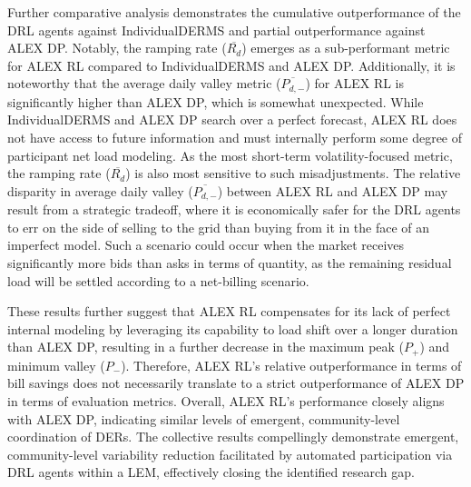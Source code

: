 \documentclass[preprint, 12pt]{elsarticle}
\begin{document}
Further comparative analysis demonstrates the cumulative outperformance of the DRL agents against IndividualDERMS and partial outperformance against ALEX DP. Notably, the ramping rate ($\overline{R_{d}}$) emerges as a sub-performant metric for ALEX RL compared to IndividualDERMS and ALEX DP. Additionally, it is noteworthy that the average daily valley metric ($\overline{P_{d,-}}$) for ALEX RL is significantly higher than ALEX DP, which is somewhat unexpected. While IndividualDERMS and ALEX DP search over a perfect forecast, ALEX RL does not have access to future information and must internally perform some degree of participant net load modeling.
%
As the most short-term volatility-focused metric, the ramping rate ($\overline{R_{d}}$) is also most sensitive to such misadjustments. The relative disparity in average daily valley ($\overline{P_{d,-}}$) between ALEX RL and ALEX DP may result from a strategic tradeoff, where it is economically safer for the DRL agents to err on the side of selling to the grid than buying from it in the face of an imperfect model. Such a scenario could occur when the market receives significantly more bids than asks in terms of quantity, as the remaining residual load will be settled according to a net-billing scenario.

These results further suggest that ALEX RL compensates for its lack of perfect internal modeling by leveraging its capability to load shift over a longer duration than ALEX DP, resulting in a further decrease in the maximum peak ($P_{+}$) and minimum valley ($P_{-}$). Therefore, ALEX RL's relative outperformance in terms of bill savings does not necessarily translate to a strict outperformance of ALEX DP in terms of evaluation metrics. Overall, ALEX RL's performance closely aligns with ALEX DP, indicating similar levels of emergent, community-level coordination of DERs. The collective results compellingly demonstrate emergent, community-level variability reduction facilitated by automated participation via DRL agents within a LEM, effectively closing the identified research gap.
\end{document}
